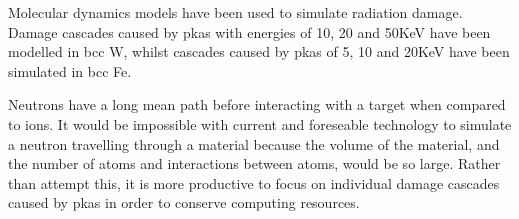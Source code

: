 Molecular dynamics models have been used to simulate radiation damage.  Damage cascades caused by \acrfull{pka}s with energies of 10, 20 and 50KeV have been modelled in \acrshort{bcc} \Gls{W}\cite{damagebcctungsten}, whilst cascades caused by \acrshort{pka}s of 5, 10 and 20KeV have been simulated in \acrshort{bcc} Fe\cite{damagebcciron}.

Neutrons have a long mean path before interacting with a target when compared to ions.  It would be impossible with current and foreseable technology to simulate a neutron travelling through a material because the volume of the material, and the number of atoms and interactions between atoms, would be so large.  Rather than attempt this, it is more productive to focus on individual damage cascades caused by \acrshort{pka}s in order to conserve computing resources.

